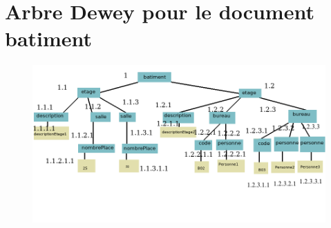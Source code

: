 \chapter{Arbre Dewey pour le document batiment}
\begin{figure}
  \includegraphics[width=\linewidth]{batiment_dewey_tree.png}
\end{figure}
